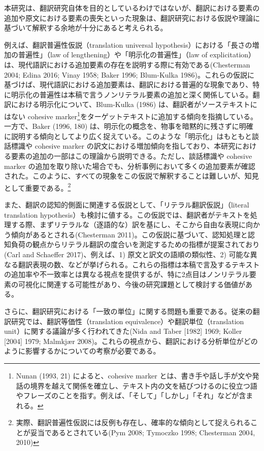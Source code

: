 \documentclass[
  letterpaper,
  DIV=11,
  numbers=noendperiod]{scrartcl}
\begin{document}
本研究は、翻訳研究自体を目的としているわけではないが、翻訳における要素の追加や原文における要素の喪失といった現象は、翻訳研究における仮説や理論に基づいて解釈する余地が十分にあると考えられる。

例えば、翻訳普遍性仮説（translation universal
hypothesis）における「長さの増加の普遍性」（law of
lengthening）や「明示化の普遍性」（law of
explicitation）は、現代語訳における追加要素の存在を説明する際に有効である(Chesterman
2004; Edina 2016; Vinay 1958; Baker 1996; Blum-Kulka
1986)。これらの仮説に基づけば、現代語訳における追加要素は、翻訳における普遍的な現象であり、特に明示化の普遍性は本稿で言うノンリテラル要素の追加と深く関係している。翻訳における明示化について、Blum-Kulka
(1986) は、翻訳者がソーステキストにはない cohesive
marker\footnote{Nunan (1993, 21) によると、cohesive marker
  とは、書き手や話し手が文や発話の境界を越えて関係を確立し、テキスト内の文を結びつけるのに役立つ語やフレーズのことを指す。例えば、「そして」「しかし」「それ」などが含まれる。}をターゲットテキストに追加する傾向を指摘している。一方で、Baker
(1996, 180)
は、明示化の概念を、物事を暗黙的に残さずに明確に説明する傾向としてより広く捉えている。このような「明示化」はもともと談話標識や
cohesive marker
の訳文における増加傾向を指しており、本研究における要素の追加の一部はこの理論から説明できる。ただし、談話標識や
cohesive marker
の追加を取り除いた場合でも、分析事例において多くの追加要素が確認された。このように、すべての現象をこの仮説で解釈することは難しいが、知見として重要である。\footnote{実際、翻訳普遍性仮説には反例も存在し、確率的な傾向として捉えられることが妥当であるとされている(Pym
  2008; Tymoczko 1998; Chesterman 2004, 2010)}

また、翻訳の認知的側面に関連する仮説として、「リテラル翻訳仮説」（literal
translation
hypothesis）も検討に値する。この仮説では、翻訳者がテキストを処理する際、まずリテラルな（逐語的な）訳を基にし、そこから自由な表現に向かう傾向があるとされる(Chesterman
2011)。この仮説に基づいて、認知処理と認知負荷の観点からリテラル翻訳の度合いを測定するための指標が提案されており(Carl
and Schaeffer 2017)、例えば、1) 原文と訳文の語順の類似性、2)
可能な異なる翻訳表現の数、などが挙げられる。これらの指標は本稿で言及するテキストの追加率や不一致率とは異なる視点を提供するが、特に2点目はノンリテラル要素の可視化に関連する可能性があり、今後の研究課題として検討する価値がある。

さらに、翻訳研究における「一致の単位」に関する問題も重要である。従来の翻訳研究では、翻訳等価性（translation
equivalence）や翻訳単位（translation
unit）に関する議論が多く行われてきた(Nida and Taber {[}1982{]} 1969;
Koller {[}2004{]} 1979; Malmkjær
2008)。これらの視点から、翻訳における分析単位がどのように影響するかについての考察が必要である。
\end{document}
